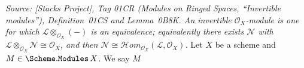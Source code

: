 \begin{definition}\leanok
  \label{def:scheme_modules_isinvertible}
  \textit{Source: [Stacks Project], Tag 01CR (Modules on Ringed Spaces,
  ``Invertible modules''), Definition~01CS and Lemma~0B8K. An invertible
  \(\mathcal{O}_X\)-module is one for which \(\mathcal{L} \otimes_{\mathcal{O}_X}
  (-)\) is an equivalence; equivalently there exists \(\mathcal{N}\) with
  \(\mathcal{L} \otimes_{\mathcal{O}_X} \mathcal{N} \cong \mathcal{O}_X\), and
  then \(\mathcal{N} \cong \mathcal{H}om_{\mathcal{O}_X}(\mathcal{L},
  \mathcal{O}_X)\).}
  Let \(X\) be a scheme and \(M \in \Scheme.\mathtt{Modules}\,X\). We say \(M\)

\end{definition}
